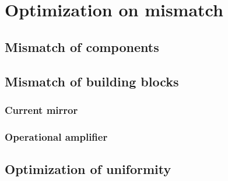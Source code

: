 \chapter{Optimization on mismatch}

\section{Mismatch of components}

\section{Mismatch of building blocks}
\subsection{Current mirror}
\subsection{Operational amplifier}

\section{Optimization of uniformity}

















